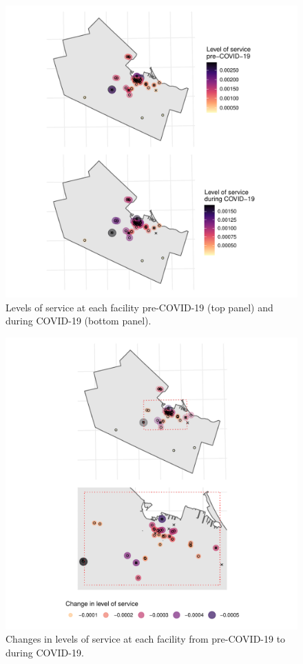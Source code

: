 \documentclass[]{elsarticle} %
\begin{document}
\begin{figure}
\includegraphics[width=1\linewidth]{Accessibility-Foodbanks-Hamilton_files/figure-latex/plot-levels-of-service-1} \caption{\label{fig:levels-of-service}Levels of service at each facility pre-COVID-19 (top panel) and during COVID-19 (bottom panel).}\label{fig:plot-levels-of-service}
\end{figure}

\begin{figure}
\includegraphics[width=1\linewidth]{Accessibility-Foodbanks-Hamilton_files/figure-latex/plot-levels-of-service-changes-1} \caption{\label{fig:levels-of-service-changes}Changes in levels of service at each facility from pre-COVID-19 to during COVID-19.}\label{fig:plot-levels-of-service-changes}
\end{figure}
\end{document}
